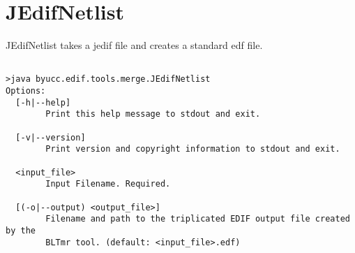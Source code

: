 \section{JEdifNetlist}
JEdifNetlist takes a jedif file and creates a standard edf file.
\begin{verbatim}

>java byucc.edif.tools.merge.JEdifNetlist
Options:
  [-h|--help]
        Print this help message to stdout and exit.

  [-v|--version]
        Print version and copyright information to stdout and exit.

  <input_file>
        Input Filename. Required.

  [(-o|--output) <output_file>]
        Filename and path to the triplicated EDIF output file created by the
        BLTmr tool. (default: <input_file>.edf)

\end{verbatim}
